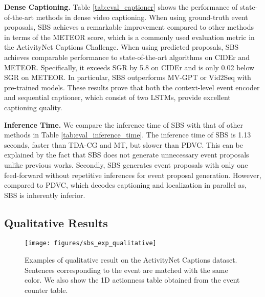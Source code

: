 \textbf{Dense Captioning.}
Table \ref{tab:eval_captioner} shows the performance of state-of-the-art methods in dense video captioning.
When using ground-truth event proposals, SBS achieves a remarkable improvement compared to other methods in terms of the METEOR score, which is a commonly used evaluation metric in the ActivityNet Captions Challenge.
When using predicted proposals, SBS achieves comparable performance to state-of-the-art algorithms on CIDEr and METEOR.
Specifically, it exceeds SGR by 5.8 on CIDEr and is only 0.02 below SGR on METEOR.
In particular, SBS outperforms MV-GPT or Vid2Seq with pre-trained models.
These results prove that both the context-level event encoder and sequential captioner, which consist of two LSTMs, provide excellent captioning quality.

\textbf{Inference Time.}
We compare the inference time of SBS with that of other methods in Table \ref{tab:eval_inference_time}.
The inference time of SBS is 1.13 seconds, faster than TDA-CG and MT, but slower than PDVC.
This can be explained by the fact that SBS does not generate unnecessary event proposals unlike previous works.
Secondly, SBS generates event proposals with only one feed-forward without repetitive inferences for event proposal generation.
However, compared to PDVC, which decodes captioning and localization in parallel as, SBS is inherently inferior.

\subsection{Qualitative Results}
\label{subsec:exp_qualitative}

\begin{figure*}[t]
  \centering
  \texttt{[image: figures/sbs\_exp\_qualitative]}
  \caption{
    Examples of qualitative result on the ActivityNet Captions dataset.
    Sentences corresponding to the event are matched with the same color.
    We also show the 1D actionness table obtained from the event counter table.
  }
  \label{fig:experiment_qualitative}
\end{figure*}

